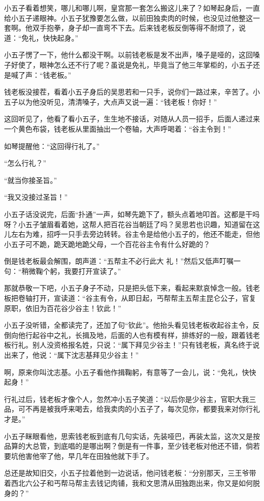 小五子看着想笑，哪儿和哪儿啊，皇宫那一套怎么搬这儿来了？如琴起身后，一直给小五子递眼神。小五子犹豫要怎么做，以前田独卖肉的时候，也没见过他整这一套啊。他双手抱拳，身子却一直弯不下去。后来钱老板反倒等得不耐烦了，说道：“免礼，快快起身。”

小五子愣了一下，他什么都没干啊。以前钱老板是发不出声，嗓子是哑的，这回嗓子好使了，眼神怎么还不行了呢？虽说是免礼，毕竟当了他三年掌柜的，小五子还是喊了声：“钱老板。”

钱老板没接茬，看着小五子身后的吴思若和一只手，说你们一路过来，辛苦了。小五子以为他没听见，清清嗓子，大点声又说一遍：“钱老板！你好！”

这回听见了，他看了看小五子，生生地不接话，对随从人员一招手，后面人递过来一个黄色布袋，钱老板从里面抽出一个卷轴，大声呼喝着：“谷主令到！”

如琴提醒他：“这回得行礼了。”

“怎么行礼？”

“就当你接圣旨。”

“我又没接过圣旨！”

小五子话没说完，后面“扑通”一声，如琴先跪下了，额头点着地叩首。这都是干吗呀？小五子皱眉看着她，这帮人把百花谷当朝廷了吗？吴思若也识趣，知道留在这儿左右为难，招呼一只手去旁边转转。谷主令是给他小五子的，他还不能走，但他小五子可不跪，跪天跪地跪父母，一个百花谷主令有什么好跪的？

倒是钱老板最会解围，朗声道：“五帮主不必行此大
礼！”然后又低声叮嘱一句：“稍微鞠个躬，我要打开宣读了。”

那就恭敬一下吧，小五子身子不动，只是把头低下来，看起来默哀悼念一般。钱老板把卷轴打开，宣读道：“谷主有令，从即日起，丐帮帮主五帮主昆仑公子，官复原职，依旧为百花谷少谷主！钦此！”

小五子没听错，全都读完了，还加了句“钦此”。他抬头看见钱老板收起谷主令，反倒向他行起谷中之礼，长揖及地，后面的人也有模有样，排练好的一般，跟着钱老板行礼。别人没资格报名姓，只说：“属下拜见少谷主！”只有钱老板，真名终于说出来了，他说：“属下沈志基拜见少谷主！”

啊，原来你叫沈志基。小五子看他作揖鞠躬，有意等了一会儿，说：“免礼，快快起身！”

行礼过后，钱老板才像个人，忽然冲小五子笑道：“以后你是少谷主，官职大我三品，可不再是被我呼来喝去，给我卖肉的小五子了，每次见你，都要我来对你行礼才是。”

小五子眯眼看他，思索钱老板到底有几句实话，先装哑巴，再装太监，这次又是按品算的大总管，到底唱的是哪出啊？倒是有一件事，至少钱老板对他还不错，倘若要坑他害他宰了他，早几年在田独他就下手了。

总还是故知旧交，小五子拉着他到一边说话，他问钱老板：“分别那天，三王爷带着西北六公子和丐帮马帮主去钱记肉铺，我和文思清从田独跑出来，你又是如何脱身的？”

